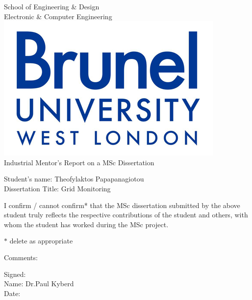 \newpage
\thispagestyle{empty}
\begin{center}
\Large
School of Engineering \& Design\\
Electronic \& Computer Engineering\\
\vspace{0.5\baselineskip}
\includegraphics{images/brunellogo}\\
\Large
Industrial Mentor's Report on a MSc Dissertation\\
\end{center}
\Large
\vspace{0.5\baselineskip}
Student's name: Theofylaktos Papapanagiotou
\\
Dissertation Title: Grid Monitoring

\vspace{0.5\baselineskip}
\large
\noindent

I confirm / cannot confirm* that the MSc dissertation submitted by the above student
truly reflects the respective contributions of the student and others, with whom the
student has worked during the MSc project.

\vspace{0.5\baselineskip}
$*$ delete as appropriate

\vspace{1\baselineskip}
Comments:


\vspace{2.5\baselineskip}
\noindent
Signed:\\
Name: Dr.Paul Kyberd\\
Date: